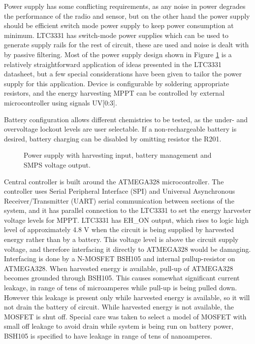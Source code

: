 Power supply has some conflicting requirements, as any noise in power degrades the performance of the radio and sensor, but on the other hand the power supply should be efficient switch mode power supply to keep power consumption at minimum. LTC3331 has switch-mode power supplies which can be used to generate supply rails for the rest of circuit, these are used and noise is dealt with by passive filtering. Most of the power supply design shown in Figure \ref{fig:psu_circuit} is a relatively straightforward application of ideas presented in the LTC3331 datasheet, but a few special considerations have been given to tailor the power supply for this application. Device is configurable by soldering appropriate resistors, and the energy harvesting MPPT can be controlled by external microcontroller using signals UV[0:3]. 

Battery configuration allows different chemistries to be tested, as the under- and overvoltage lockout levels are user selectable. If a non-rechargeable battery is desired, battery charging can be disabled by omitting resistor the R201. 

\begin{figure}[htb]
    \centering
    \def\svgwidth{\columnwidth}
    
    \caption{\label{fig:psu_circuit} Power supply with harvesting input, battery management and SMPS voltage output.}
\end{figure}

Central controller is built around the ATMEGA328 \cite{atmega328} microcontroller. The controller uses Serial Peripheral Interface (SPI) and Universal Asynchronous Receiver/Transmitter (UART) serial communication between sections of the system, and it has parallel connection to the LTC3331 to set the energy harvester voltage levels for MPPT. LTC3331 has EH\_ON output, which rises to logic high level of approximately 4.8 V when the circuit is being supplied by harvested energy rather than by a battery. This voltage level is above the circuit supply voltage, and therefore interfacing it directly to ATMEGA328 would be damaging. Interfacing is done by a N-MOSFET BSH105 \cite{BSH105} and internal pullup-resistor on ATMEGA328. When harvested energy is available, pull-up of ATMEGA328 becomes grounded through BSH105. This causes somewhat significant current leakage, in range of tens of microamperes while pull-up is being pulled down. However this leakage is present only while harvested energy is available, so it will not drain the battery of circuit. While harvested energy is not available, the MOSFET is shut off. Special care was taken to select a model of MOSFET with small off leakage to avoid drain while system is being run on battery power, BSH105 is specified to have leakage in range of tens of nanoamperes. 

